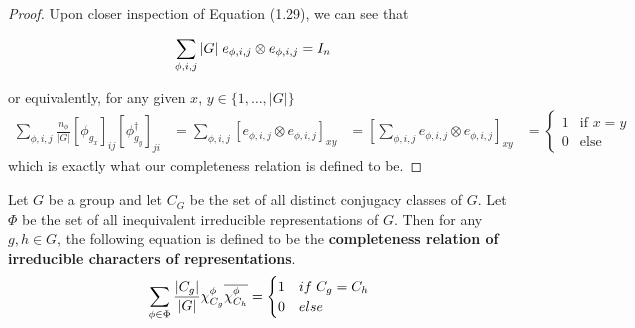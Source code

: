 \begin{proof}
Upon closer inspection of Equation (1.29), we can see that 

\begin{equation}
	\begin{aligned}
		\sum_{\phi,i,j} {|G|} \hspace{1mm}e_{\phi,i,j} \otimes e_{\phi,i,j} &= I_n
	\end{aligned}
\end{equation}

or equivalently, for any given $x$, $y \in \{1,\hdots,|G|\}$ 
\begin{equation}
	\begin{aligned}
		\sum_{\phi,i,j} \frac{n_\phi}{|G|} [\phi_{g_x}]_{ij}[\phi^\dag_{g_y}]_{ji} &= \sum_{\phi,i,j} \left[e_{\phi,i,j} \otimes e_{\phi,i,j}\right]_{xy} &= \left[\sum_{\phi,i,j} e_{\phi,i,j} \otimes e_{\phi,i,j}\right]_{xy} &= \begin{cases}
																	1 & \text{if } x=y\\
																	0 & \text{else}
																\end{cases}
	\end{aligned}
\end{equation}
which is exactly what our completeness relation is defined to be. \end{proof} 







\begin{theorem}
Let $G$ be a group and let $C_G$ be the set of all distinct conjugacy classes of $G$. Let $\Phi$ be the set of all inequivalent irreducible representations of $G$. Then for any $g,h \in G$, the following equation is defined to be the \textbf{completeness relation of irreducible characters of representations}.
$$\sum_{\phi \in \Phi} \frac{|C_g|}{|G|} \chi^{\phi}_{C_g} \overline{\chi^{\phi}_{C_h}} = \begin{cases}
																1 & if \hspace{1mm} C_g = C_h \\
																0 & else
															\end{cases}$$
\end{theorem}

